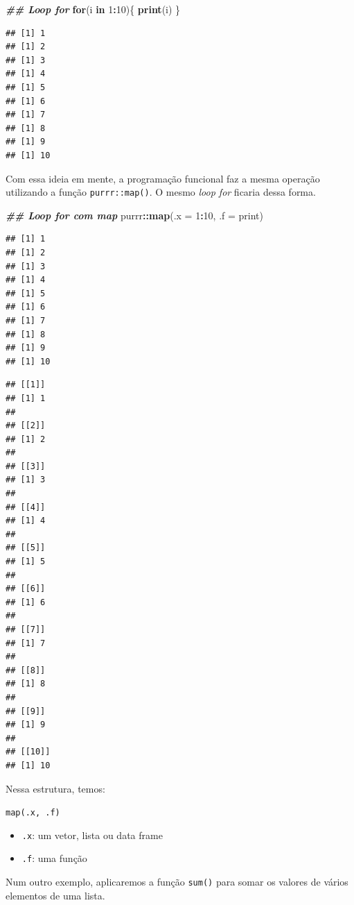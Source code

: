 \documentclass[
]{article}
\newenvironment{Shaded}{\begin{snugshade}}{\end{snugshade}}
\newcommand{\AttributeTok}[1]{\textcolor[rgb]{0.13,0.29,0.53}{#1}}
\newcommand{\ControlFlowTok}[1]{\textcolor[rgb]{0.13,0.29,0.53}{\textbf{#1}}}
\newcommand{\DecValTok}[1]{\textcolor[rgb]{0.00,0.00,0.81}{#1}}
\newcommand{\DocumentationTok}[1]{\textcolor[rgb]{0.56,0.35,0.01}{\textbf{\textit{#1}}}}
\newcommand{\FunctionTok}[1]{\textcolor[rgb]{0.13,0.29,0.53}{\textbf{#1}}}
\newcommand{\NormalTok}[1]{#1}
\newcommand{\SpecialCharTok}[1]{\textcolor[rgb]{0.81,0.36,0.00}{\textbf{#1}}}
\providecommand{\tightlist}{%
  \setlength{\itemsep}{0pt}\setlength{\parskip}{0pt}}
\begin{document}
\begin{Shaded}
\begin{Highlighting}[]
\DocumentationTok{\#\# Loop for}
\ControlFlowTok{for}\NormalTok{(i }\ControlFlowTok{in} \DecValTok{1}\SpecialCharTok{:}\DecValTok{10}\NormalTok{)\{}
    \FunctionTok{print}\NormalTok{(i)}
\NormalTok{\}}
\end{Highlighting}
\end{Shaded}

\begin{verbatim}
## [1] 1
## [1] 2
## [1] 3
## [1] 4
## [1] 5
## [1] 6
## [1] 7
## [1] 8
## [1] 9
## [1] 10
\end{verbatim}

Com essa ideia em mente, a programação funcional faz a mesma operação utilizando a função \texttt{purrr::map()}. O mesmo \emph{loop for} ficaria dessa forma.

\begin{Shaded}
\begin{Highlighting}[]
\DocumentationTok{\#\# Loop for com map}
\NormalTok{purrr}\SpecialCharTok{::}\FunctionTok{map}\NormalTok{(}\AttributeTok{.x =} \DecValTok{1}\SpecialCharTok{:}\DecValTok{10}\NormalTok{, }\AttributeTok{.f =}\NormalTok{ print)}
\end{Highlighting}
\end{Shaded}

\begin{verbatim}
## [1] 1
## [1] 2
## [1] 3
## [1] 4
## [1] 5
## [1] 6
## [1] 7
## [1] 8
## [1] 9
## [1] 10
\end{verbatim}

\begin{verbatim}
## [[1]]
## [1] 1
## 
## [[2]]
## [1] 2
## 
## [[3]]
## [1] 3
## 
## [[4]]
## [1] 4
## 
## [[5]]
## [1] 5
## 
## [[6]]
## [1] 6
## 
## [[7]]
## [1] 7
## 
## [[8]]
## [1] 8
## 
## [[9]]
## [1] 9
## 
## [[10]]
## [1] 10
\end{verbatim}

Nessa estrutura, temos:

\texttt{map(.x,\ .f)}

\begin{itemize}
\tightlist
\item
  \texttt{.x}: um vetor, lista ou data frame
\item
  \texttt{.f}: uma função
\end{itemize}

Num outro exemplo, aplicaremos a função \texttt{sum()} para somar os valores de vários elementos de uma lista.
\end{document}
